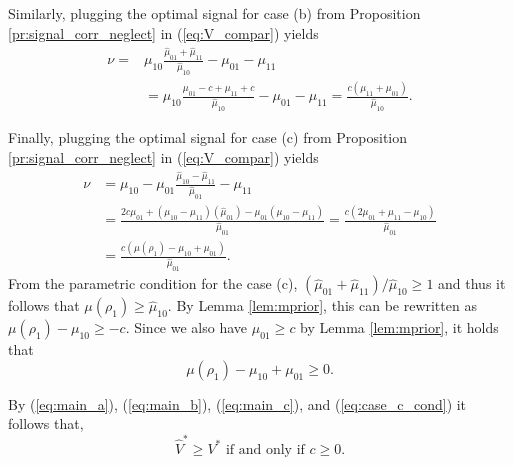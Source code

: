 \documentclass[12pt,english]{article}
\theoremstyle{plain}
\begin{document}
\begin{appendices}
Similarly, plugging the optimal signal for case (b) from Proposition  \ref{pr:signal_corr_neglect} in (\ref{eq:V_compar}) yields
\begin{equation}
\begin{aligned}
\nu=&\mu_{10}\frac{\hat{\mu}_{01}+\hat{\mu}_{11}}{\hat{\mu}_{10}}-\mu_{01}-\mu_{11}\\
&=\mu_{10}\frac{\mu_{01}-c+\mu_{11}+c}{\hat{\mu}_{10}}-\mu_{01}-\mu_{11}=\frac{c\left(\mu_{11}+\mu_{01}\right)}{\hat{\mu}_{10}}.
\end{aligned} \label{eq:main_b}
\end{equation}

Finally, plugging  the optimal signal for case (c) from Proposition  \ref{pr:signal_corr_neglect} in (\ref{eq:V_compar}) yields
\begin{equation}
\begin{aligned}
\nu&=\mu_{10}-\mu_{01}\frac{\hat{\mu}_{10}-\hat{\mu}_{11}}{\hat{\mu}_{01}}-\mu_{11}\\&=
\frac{2c\mu_{01}+\left(\mu_{10}-\mu_{11}\right)\left(\hat{\mu}_{01}\right)-\mu_{01}\left(\mu_{10}-\mu_{11}\right)}{\hat{\mu}_{01}}=\frac{c\left(2\mu_{01}+\mu_{11}-\mu_{10}\right)}{\hat{\mu}_{01}}\\&=
\frac{c\left(\mu(\rho_1)-\mu_{10}+\mu_{01}\right)}{\hat{\mu}_{01}}.
\end{aligned} \label{eq:main_c} 
\end{equation}
From the parametric condition for the case (c), $(\hat{\mu}_{01}+\hat{\mu}_{11})/\hat{\mu}_{10}\geq 1$ and thus it follows that $\mu(\rho_1)\geq\hat{\mu}_{10}$.
By Lemma \ref{lem:mprior}, this can be rewritten as $\mu(\rho_1) - \mu_{10}\geq  - c$. 
Since we also have $\mu_{01}\geq c$ by Lemma \ref{lem:mprior}, it holds that
\begin{equation}
    \mu(\rho_1)-\mu_{10}+\mu_{01}\geq0.
    \label{eq:case_c_cond}
\end{equation}

By (\ref{eq:main_a}), (\ref{eq:main_b}),  (\ref{eq:main_c}), and (\ref{eq:case_c_cond}) it follows that,
\begin{equation}
\hat{V}^{*}\geq V^{*} \text{ if and only if } c\geq0.
\label{eq:V_compar_result}
\end{equation}


\end{appendices}
\end{document}
